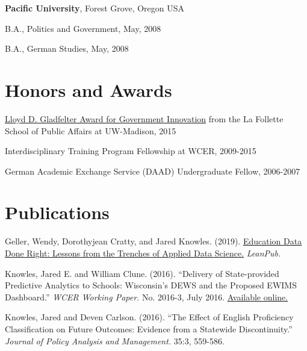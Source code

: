 \documentclass[margin,line]{res}
\newenvironment{list1}{
  \begin{list}{\ding{113}}{%
      \setlength{\itemsep}{0in}
      \setlength{\parsep}{0in} \setlength{\parskip}{0in}
      \setlength{\topsep}{0in} \setlength{\partopsep}{0in} 
      \setlength{\leftmargin}{0.17in}}}{\end{list}}
\begin{document}
\begin{resume}
{\bf Pacific University}, Forest Grove, Oregon USA\\
\vspace*{-.1in}
\begin{list1}
\item[] B.A., Politics and Government,  May, 2008
\item[] B.A., German Studies, May, 2008
\end{list1}


\section{\sc Honors and Awards} 

\href{https://www.lafollette.wisc.edu/news/2015-gladfelter-winners-announced}{Lloyd D. Gladfelter Award for Government Innovation} from the La Follette School of Public Affairs at UW-Madison, 2015

\vspace*{-2.5mm}

Interdisciplinary Training Program Fellowship at WCER, 2009-2015

\vspace*{-2.5mm}

German Academic Exchange Service (DAAD) Undergraduate Fellow, 2006-2007



\section{\sc Publications}

Geller, Wendy, Dorothyjean Cratty, and Jared Knowles. (2019). \uline{Education Data Done Right: Lessons from the Trenches of Applied Data Science.} \emph{LeanPub.}


Knowles, Jared E. and William Clune. (2016). ``Delivery of State-provided Predictive
Analytics to Schools: Wisconsin’s DEWS and the Proposed EWIMS Dashboard.'' 
\emph{WCER Working Paper.} No. 2016-3, July 2016. \href{http://wcer-web.ad.education.wisc.edu/docs/working-papers/Working_Paper_No_2016_03.pdf}{Available online.}

Knowles, Jared and Deven Carlson. (2016). ``The Effect of English Proficiency Classification on Future Outcomes: 
Evidence from a Statewide Discontinuity.'' \emph{Journal of Policy Analysis and Management.}
35:3, 559-586. 


\end{resume}
\end{document}
